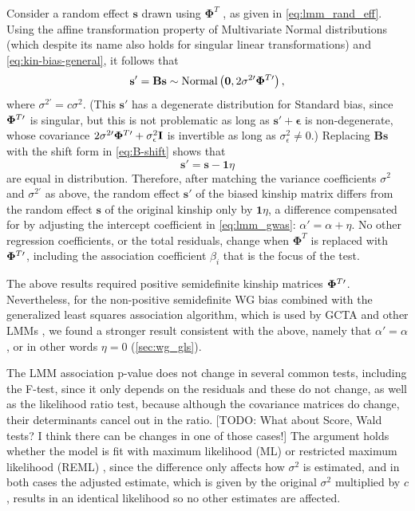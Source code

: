 \documentclass[11pt]{article}
\newcommand{\kinMat}[1][T]{%
  \ensuremath{%
    \mathbf{\Phi}^{#1}
  }%
  \xspace%
}%
\newcommand{\kinMatPrime}{%
  \ensuremath{%
    \mathbf{\Phi}^{T\prime}
  }%
  \xspace%
}%
\begin{document}
Consider a random effect $\mathbf{s}$ drawn using \kinMat, as given in \cref{eq:lmm_rand_eff}.
Using the affine transformation property of Multivariate Normal distributions (which despite its name also holds for singular linear transformations) and \cref{eq:kin-bias-general}, it follows that
$$
\mathbf{s}'
=
\mathbf{B} \mathbf{s}
\sim
\text{Normal} \left( \mathbf{0}, 2 \sigma^{2\prime} \kinMatPrime \right),
$$
where $\sigma^{2\prime} = c \sigma^2$.
(This $\mathbf{s}'$ has a degenerate distribution for Standard bias, since $\kinMatPrime$ is singular, but this is not problematic as long as $\mathbf{s}' + \boldsymbol{\epsilon}$ is non-degenerate, whose covariance $2 \sigma^{2\prime} \kinMatPrime + \sigma^2_\epsilon \mathbf{I}$ is invertible as long as $\sigma^2_\epsilon \ne 0$.)
Replacing $\mathbf{B} \mathbf{s}$ with the shift form in \cref{eq:B-shift} shows that
$$
\mathbf{s}' = \mathbf{s} - \mathbf{1} \eta
$$
are equal in distribution.
Therefore, after matching the variance coefficients $\sigma^2$ and $\sigma^{2\prime}$ as above, the random effect $\mathbf{s}'$ of the biased kinship matrix differs from the random effect $\mathbf{s}$ of the original kinship only by $\mathbf{1} \eta$, a difference compensated for by adjusting the intercept coefficient in \cref{eq:lmm_gwas}: $\alpha' = \alpha + \eta$.
No other regression coefficients, or the total residuals, change when \kinMat is replaced with $\kinMatPrime$, including the association coefficient $\beta_i$ that is the focus of the test.

The above results required positive semidefinite kinship matrices $\kinMatPrime$.
Nevertheless, for the non-positive semidefinite WG bias combined with the generalized least squares association algorithm, which is used by GCTA and other LMMs \citep{kang_efficient_2008, kang_variance_2010, yang_advantages_2014}, we found a stronger result consistent with the above, namely that $\alpha' = \alpha$, or in other words $\eta = 0$ (\cref{sec:wg_gls}).

The LMM association p-value does not change in several common tests, including the F-test, since it only depends on the residuals and these do not change, as well as the likelihood ratio test, because although the covariance matrices do change, their determinants cancel out in the ratio.
[TODO: What about Score, Wald tests?  I think there can be changes in one of those cases!]
The argument holds whether the model is fit with maximum likelihood (ML) or restricted maximum likelihood (REML) \citep{kang_efficient_2008}, since the difference only affects how $\sigma^2$ is estimated, and in both cases the adjusted estimate, which is given by the original $\sigma^2$ multiplied by $c$, results in an identical likelihood so no other estimates are affected.
\end{document}
